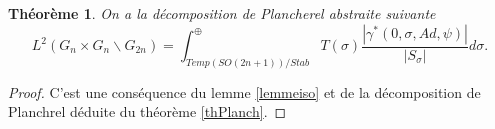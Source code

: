 \documentclass{amsart}
\newtheorem{theoreme}{Théorème}[section]
\begin{document}
\begin{theoreme}
On a la décomposition de Plancherel abstraite suivante
\begin{equation}
L^2(G_n \times G_n \backslash G_{2n}) = \int^{\oplus}_{Temp(SO(2n+1))/Stab} T(\sigma) \frac{|\gamma^*(0, \sigma, Ad, \psi)|}{|S_\sigma|} d\sigma.
\end{equation}
\end{theoreme}

\begin{proof}
C'est une conséquence du lemme \ref{lemmeiso} et de la décomposition de Planchrel déduite du théorème \ref{thPlanch}.
\end{proof}

 
 
\end{document}
